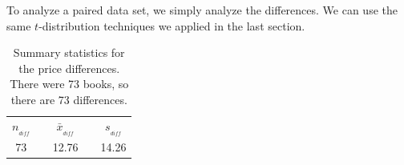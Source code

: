 To analyze a paired data set, we simply analyze the differences. We can use the same $t$-distribution techniques we applied in the last section.

\begin{table}[hh]
\centering
\begin{tabular}{ccccc}
\hline
$n_{_{diff}}$	&\hspace{3mm}& $\bar{x}_{_{diff}}$	&\hspace{3mm}& $s_{_{diff}}$ \vspace{1mm}\\
73			&& 12.76				&& 14.26 \\
\hline
\end{tabular}
\caption{Summary statistics for the price differences. There were 73 books, so there are 73 differences.}
\label{textbooksSummaryStats}
\end{table}


